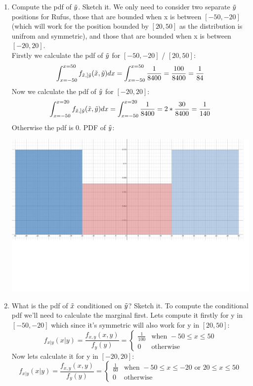 \documentclass[12pt,twoside]{article}
\newcommand{\ry}{\rnd{ y}  }
\newcommand{\rx}{\rnd{ x}  }
\newcommand{\rnd}{\Tilde}
\begin{document}
\begin{enumerate}
\begin{enumerate}
\item Compute the pdf of $\ry$. Sketch it. 
\subitem We only need to consider two separate $\ry$ positions for Rufus, those that are bounded when x is between $[-50,-20]$ (which will work for the position bounded by $[20,50]$ as the distribution is unifrom and symmetric), and those that are bounded when x is between $[-20,20]$.\\
Firstly we calculate the pdf of $\ry$ for $[-50,-20]$ / $[20,50]$:
$$
    \int_{x=-50}^{x=50} f_{\rx,]\ry}(\rx,\ry)dx = \int_{x=-50}^{x=50} \frac{1}{8400} = \frac{100}{8400} = \frac{1}{84}
$$
Now we calculate the pdf of $\ry$ for $[-20,20]$:
$$
    \int_{x=-50}^{x=20} f_{\rx,]\ry}(\rx,\ry)dx = \int_{x=-50}^{x=20} \frac{1}{8400} = 2*\frac{30}{8400} = \frac{1}{140}
$$
Otherwise the pdf is 0. PDF of $\ry$:

\includegraphics[scale=.3]{image.png}

\newpage 

\item What is the pdf of $\rx$ conditioned on $\ry$? Sketch it. 
\subitem To compute the conditional pdf we'll need to calculate the marginal first. Lets compute it firstly for y in $[-50,-20]$ which since it's symmetric will also work for y in $[20,50]$:
$$
    f_{x|y}(x|y) = \frac{f_{x,y}(x,y)}{f_y(y)} = 
    \begin{cases} 
    \frac{1}{100} & \text{when } -50 \leq x \leq 50 \\
    0 & \text{otherwise} 
    \end{cases}
$$
Now lets calculate it for y in $[-20,20]$:
$$
    f_{x|y}(x|y) = \frac{f_{x,y}(x,y)}{f_y(y)} = 
    \begin{cases} 
    \frac{1}{60} & \text{when } -50 \leq x \leq -20 \text{ or } 20 \leq x \leq 50 \\
    0 & \text{otherwise} 
    \end{cases}
$$


\end{enumerate}
\end{enumerate}
\end{document}
